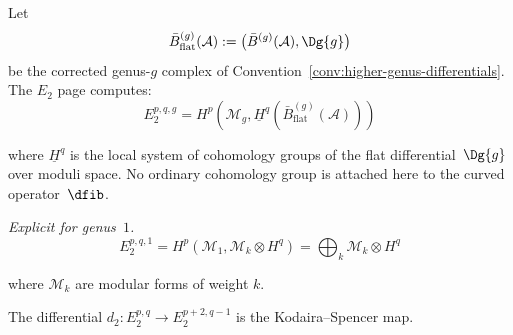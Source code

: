 \begin{theorem}
\label{thm:e2-page-complete}
Let
\[
\bar{B}^{(g)}_{\mathrm{flat}}(\mathcal A)
:=\bigl(\bar{B}^{(g)}(\mathcal A),\Dg{g}\bigr)
\]
be the corrected genus-$g$ complex of
Convention~\textup{\ref{conv:higher-genus-differentials}}. The
$E_2$ page computes:
\begin{equation}
E_2^{p,q,g}
=
H^p\left(\mathcal{M}_g,
\underline{H}^q(\bar{B}^{(g)}_{\mathrm{flat}}(\mathcal A))\right)
\end{equation}

where $\underline{H}^q$ is the local system of cohomology groups of
the flat differential~$\Dg{g}$ over moduli space. No ordinary
cohomology group is attached here to the curved operator~$\dfib$.

\emph{Explicit for genus~$1$.}
\begin{equation}
E_2^{p,q,1} = H^p(\mathcal{M}_1, \mathcal{M}_k \otimes H^q) = \bigoplus_{k} \mathcal{M}_k \otimes H^{q}
\end{equation}

where $\mathcal{M}_k$ are modular forms of weight $k$.

The differential $d_2: E_2^{p,q} \to E_2^{p+2,q-1}$ is the Kodaira--Spencer map.
\end{theorem}

